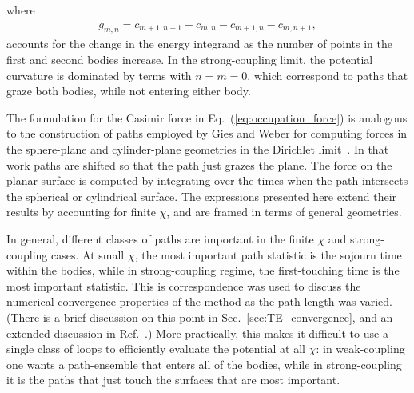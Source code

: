 where 
\begin{align}
  g_{m,n}=c_{m+1,n+1}+c_{m,n}-c_{m+1,n}-c_{m,n+1},
\end{align}
accounts for the change in the energy integrand as the number of points in the first and second
bodies increase.
In the strong-coupling limit, the potential curvature is dominated by terms with $n=m=0$,
which correspond to paths that graze both bodies, while not entering either body.  

The formulation for the Casimir force in Eq.~(\ref{eq:occupation_force}) 
is analogous to the construction of paths employed by Gies and Weber for computing 
forces in the sphere-plane and cylinder-plane geometries in the Dirichlet limit~\cite{Weber2010}.  
In that work paths are shifted so that the path just grazes the plane.  The force on the planar
surface is computed by integrating over the times when the path intersects the spherical or cylindrical surface.
The expressions presented here extend their results by accounting for finite $\chi$, 
and are framed in terms of general geometries.  

In general, different classes of paths are important in the finite $\chi$ and strong-coupling 
cases.  At small $\chi$, the most important path statistic is the sojourn time within the bodies,
while in strong-coupling regime, the first-touching time is the most important statistic.    
This is correspondence was used to discuss the numerical convergence properties of the method as 
the path length was varied.  (There is a brief discussion on this point in Sec.~\ref{sec:TE_convergence},
and an extended discussion in Ref.~\cite{Mackrory2016}.)
More practically, this makes it difficult to use a single class of loops to efficiently evaluate the potential at all $\chi$:
in weak-coupling one wants a path-ensemble that enters all of the bodies, while in strong-coupling
it is the paths that just touch the surfaces that are most important.

